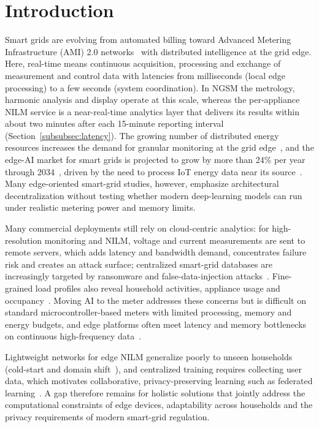 \documentclass[fleqn,10pt]{wlscirep}
\begin{document}
\section{Introduction}
\label{sec:introduction}

Smart grids are evolving from automated billing toward Advanced Metering Infrastructure (AMI) 2.0 networks~\cite{ami2.0} with distributed intelligence at the grid edge. Here, real-time means continuous acquisition, processing and exchange of measurement and control data with latencies from milliseconds (local edge processing) to a few seconds (system coordination). In NGSM the metrology, harmonic analysis and display operate at this scale, whereas the per-appliance NILM service is a near-real-time analytics layer that delivers its results within about two minutes after each 15-minute reporting interval (Section~\ref{subsubsec:latency}). The growing number of distributed energy resources increases the demand for granular monitoring at the grid edge~\cite{Market2025}, and the edge-AI market for smart grids is projected to grow by more than 24\% per year through 2034~\cite{Precedence2025}, driven by the need to process IoT energy data near its source~\cite{JISEM2025}. Many edge-oriented smart-grid studies, however, emphasize architectural decentralization without testing whether modern deep-learning models can run under realistic metering power and memory limits.

Many commercial deployments still rely on cloud-centric analytics: for high-resolution monitoring and NILM, voltage and current measurements are sent to remote servers, which adds latency and bandwidth demand, concentrates failure risk and creates an attack surface; centralized smart-grid databases are increasingly targeted by ransomware and false-data-injection attacks~\cite{EnergiesSec2025}. Fine-grained load profiles also reveal household activities, appliance usage and occupancy~\cite{MDPI2025}. Moving AI to the meter addresses these concerns but is difficult on standard microcontroller-based meters with limited processing, memory and energy budgets, and edge platforms often meet latency and memory bottlenecks on continuous high-frequency data~\cite{EdgeNILM2025}.

Lightweight networks for edge NILM generalize poorly to unseen households (cold-start and domain shift~\cite{IEEE2024}), and centralized training requires collecting user data, which motivates collaborative, privacy-preserving learning such as federated learning~\cite{SciRep2025}. A gap therefore remains for holistic solutions that jointly address the computational constraints of edge devices, adaptability across households and the privacy requirements of modern smart-grid regulation.
\end{document}
